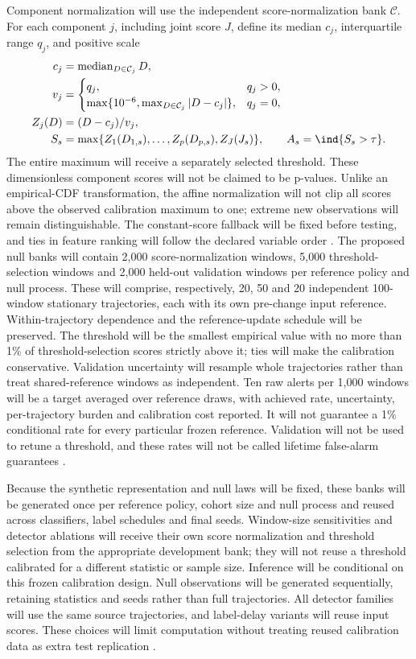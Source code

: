 Component normalization will use the independent score-normalization bank $\mathcal C$. For each component $j$, including joint score $J$, define its median $c_j$, interquartile range $q_j$, and positive scale
\begin{align}
c_j&=\operatorname{median}_{D\in\mathcal C_j}D,\\
v_j&=\begin{cases}q_j,&q_j>0,\\
\max\{10^{-6},\max_{D\in\mathcal C_j}|D-c_j|\},&q_j=0,
\end{cases}\\
Z_j(D)&=(D-c_j)/v_j,\\
S_s&=\max\{Z_1(D_{1,s}),\ldots,Z_p(D_{p,s}),Z_J(J_s)\},\qquad
A_s=\ind\{S_s>\tau\}.
\end{align}
The entire maximum will receive a separately selected threshold. These dimensionless component scores will not be claimed to be p-values. Unlike an empirical-CDF transformation, the affine normalization will not clip all scores above the observed calibration maximum to one; extreme new observations will remain distinguishable. The constant-score fallback will be fixed before testing, and ties in feature ranking will follow the declared variable order \cite{cerqueira,gretton}.
The proposed null banks will contain 2,000 score-normalization windows, 5,000 threshold-selection windows and 2,000 held-out validation windows per reference policy and null process. These will comprise, respectively, 20, 50 and 20 independent 100-window stationary trajectories, each with its own pre-change input reference. Within-trajectory dependence and the reference-update schedule will be preserved. The threshold will be the smallest empirical value with no more than 1\% of threshold-selection scores strictly above it; ties will make the calibration conservative. Validation uncertainty will resample whole trajectories rather than treat shared-reference windows as independent. Ten raw alerts per 1,000 windows will be a target averaged over reference draws, with achieved rate, uncertainty, per-trajectory burden and calibration cost reported. It will not guarantee a 1\% conditional rate for every particular frozen reference. Validation will not be used to retune a threshold, and these rates will not be called lifetime false-alarm guarantees \cite{lukats,cerqueira}.

Because the synthetic representation and null laws will be fixed, these banks will be generated once per reference policy, cohort size and null process and reused across classifiers, label schedules and final seeds. Window-size sensitivities and detector ablations will receive their own score normalization and threshold selection from the appropriate development bank; they will not reuse a threshold calibrated for a different statistic or sample size. Inference will be conditional on this frozen calibration design. Null observations will be generated sequentially, retaining statistics and seeds rather than full trajectories. All detector families will use the same source trajectories, and label-delay variants will reuse input scores. These choices will limit computation without treating reused calibration data as extra test replication \cite{souza,cerqueira}.

